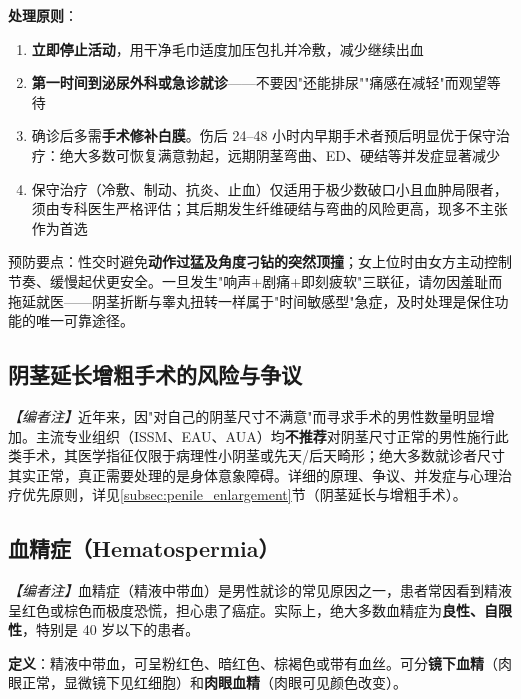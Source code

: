 \documentclass[12pt,a4paper,twoside]{ctexbook}
\begin{document}
\vspace{0.5em}
\noindent\textbf{处理原则}：
\begin{enumerate}
	\item \textbf{立即停止活动}，用干净毛巾适度加压包扎并冷敷，减少继续出血
	\item \textbf{第一时间到泌尿外科或急诊就诊}——不要因"还能排尿""痛感在减轻"而观望等待
	\item 确诊后多需\textbf{手术修补白膜}。伤后 24--48 小时内早期手术者预后明显优于保守治疗：绝大多数可恢复满意勃起，远期阴茎弯曲、ED、硬结等并发症显著减少
	\item 保守治疗（冷敷、制动、抗炎、止血）仅适用于极少数破口小且血肿局限者，须由专科医生严格评估；其后期发生纤维硬结与弯曲的风险更高，现多不主张作为首选
\end{enumerate}

\begin{tcolorbox}[colback=pink!5!white,colframe=red!50!black,title=贴心小叮咛]
预防要点：性交时避免\textbf{动作过猛及角度刁钻的突然顶撞}；女上位时由女方主动控制节奏、缓慢起伏更安全。一旦发生"响声+剧痛+即刻疲软"三联征，请勿因羞耻而拖延就医——阴茎折断与睾丸扭转一样属于"时间敏感型"急症，及时处理是保住功能的唯一可靠途径。
\end{tcolorbox}

\subsection{阴茎延长增粗手术的风险与争议}

\noindent\textit{【编者注】}近年来，因"对自己的阴茎尺寸不满意"而寻求手术的男性数量明显增加。主流专业组织（ISSM、EAU、AUA）均\textbf{不推荐}对阴茎尺寸正常的男性施行此类手术，其医学指征仅限于病理性小阴茎或先天/后天畸形；绝大多数就诊者尺寸其实正常，真正需要处理的是身体意象障碍。详细的原理、争议、并发症与心理治疗优先原则，详见\ref{subsec:penile_enlargement}节（阴茎延长与增粗手术）。

\subsection{血精症（Hematospermia）}
\label{subsec:hematospermia}

\noindent\textit{【编者注】}血精症（精液中带血）是男性就诊的常见原因之一，患者常因看到精液呈红色或棕色而极度恐慌，担心患了癌症。实际上，绝大多数血精症为\textbf{良性、自限性}，特别是 40 岁以下的患者。

\vspace{0.5em}
\noindent\textbf{定义}：精液中带血，可呈粉红色、暗红色、棕褐色或带有血丝。可分\textbf{镜下血精}（肉眼正常，显微镜下见红细胞）和\textbf{肉眼血精}（肉眼可见颜色改变）。
\end{document}
